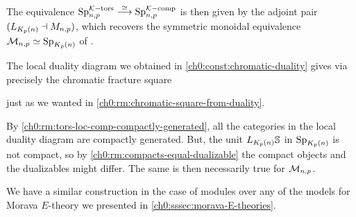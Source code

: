 \begin{remark}
    The equivalence $\mathrm{Sp}_{n,p}^{\mathcal{K}-\mathrm{tors}}\overset{\simeq}\longrightarrow \mathrm{Sp}_{n,p}^{\mathcal{K}-\mathrm{comp}}$ is then given by the adjoint pair $(L_{{K_p(n)}}\dashv M_{n,p})$, which recovers the symmetric monoidal equivalence $\mathcal{M}_{n,p} \simeq \mathrm{Sp}_{{K_p(n)}}$ of \cite[6.19]{hovey-strickland_99}. 
\end{remark}

\begin{remark}
    The local duality diagram we obtained in \cref{ch0:const:chromatic-duality} gives via \cite[2.26]{barthel-heard-valenzuela_2018} precisely the chromatic fracture square
    \begin{center}
    \end{center}
    just as we wanted in \cref{ch0:rm:chromatic-square-from-duality}.   
\end{remark}

\begin{remark}
    By \cref{ch0:rm:tors-loc-comp-compactly-generated}, all the categories in the local duality diagram are compactly generated. But, the unit $L_{{K_p(n)}}\mathbb{S}$ in $\mathrm{Sp}_{{K_p(n)}}$ is not compact, so by \cref{ch0:rm:compacts-equal-dualizable} the compact objects and the dualizables might differ. The same is then necessarily true for $\mathcal{M}_{n,p}$.
\end{remark}

We have a similar construction in the case of modules over any of the models for Morava $E$-theory we presented in \cref{ch0:sssec:morava-E-theories}. 

